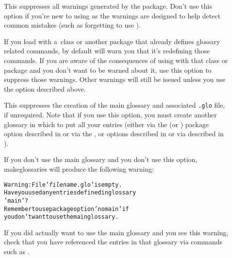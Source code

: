 \documentclass[report,inlinetitle]{nlctdoc}
\begin{document}
\begin{description}
\item[] This suppresses all warnings generated by
the  package. Don't use this option if you're new to using
 as the warnings are designed to help detect
common mistakes (such as forgetting to use ).

\item[] If you load  with
a~class or another package that already defines glossary related
commands, by default  will warn you that it's
redefining those commands. If you are aware of the consequences of
using  with that class or package and you don't
want to be warned about it, use this option to suppress those
warnings. Other warnings will still be issued unless you use the
 option described above.

\item[] This suppresses the creation of the main
glossary and associated \texttt{.glo} file, if unrequired. Note that
if you use this option, you must create another glossary in which to
put all your entries (either via the  (or
) package option described in
 or via the ,
 or  options described in
 or via  described in
).

\begin{important}
If you don't use the main glossary and you don't use this option,
\gls{makeglossaries} will produce the following warning:
\begin{alltt}
Warning: File '\emph{filename}.glo' is empty.
Have you used any entries defined in glossary 
'main'?
Remember to use package option 'nomain' if 
you don't want to use the main glossary.
\end{alltt}
If you did actually want to use the main glossary and you see this
warning, check that you have referenced the entries in that glossary
via commands such as .
\end{important}


\end{description}
\end{document}
